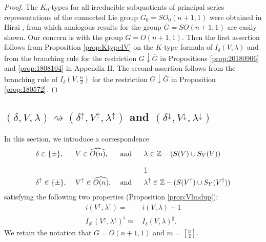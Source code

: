 \begin{proof}
The $K_0$-types for all irreducible subquotients
 of principal series representations
 of the connected Lie group $G_0=SO_0(n+1,1)$
 were obtained in Hirai \cite{Hirai62}, from
 which analogous results
 for the group $\overline G=S O(n+1,1)$
 are easily shown.  
Our concern is with the group $G=O(n+1,1)$.  
Then the first assertion follows from Proposition \ref{prop:KtypeIV}
 on the $K$-type formula 
 of $I_{\delta}(V,\lambda)$
 and from the branching rule for the restriction
 $G \downarrow \overline G$
 in Propositions \ref{prop:20180906}
 and \ref{prop:1808104} in Appendix II.  
The second assertion follows from the branching rule
 of $I_{\delta}(V,\frac n 2)$
 for the restriction $G\downarrow \overline G$
 in Proposition \ref{prop:180572}.  
\end{proof}



\subsection{$(\delta, V, \lambda)
\rightsquigarrow (\delta^{\uparrow},V^{\uparrow}, \lambda^{\uparrow})$
 and $(\delta^{\downarrow},V^{\downarrow}, \lambda^{\downarrow})$}
\label{subsec:HasseV}

In this section,
 we introduce a correspondence
\begin{alignat*}{4}
&\delta \in \{\pm\}, 
&&V \in \widehat{O(n)}, 
&&
\text{and }
&&\lambda \in {\mathbb{Z}} \setminus(S(V) \cup S_Y(V))
\\
&
&&
&&
&&
\rotatebox{270}{$\rightsquigarrow$}
\\
&\delta^{\uparrow} \in \{\pm\},\,\,
&&V^{\uparrow} \in \widehat{O(n)},\,\, 
&&
\text{and }\,\,
&&
\lambda^{\uparrow} \in {\mathbb{Z}} \setminus(S(V^{\uparrow}) \cup S_Y(V^{\uparrow}))
\end{alignat*}
satisfying the following two properties (Proposition \ref{prop:Vlmdup}):
\begin{align*}
  i(V^{\uparrow}, \lambda^{\uparrow}) =\,& i(V,\lambda)+1
\\
  I_{\delta^{\uparrow}}(V^{\uparrow}, \lambda^{\uparrow})^{\flat} \simeq\,
& I_{\delta}(V,\lambda)^{\sharp}.  
\end{align*}
We retain the notation
 that $G=O(n+1,1)$
 and $m = [\frac n 2]$.  

